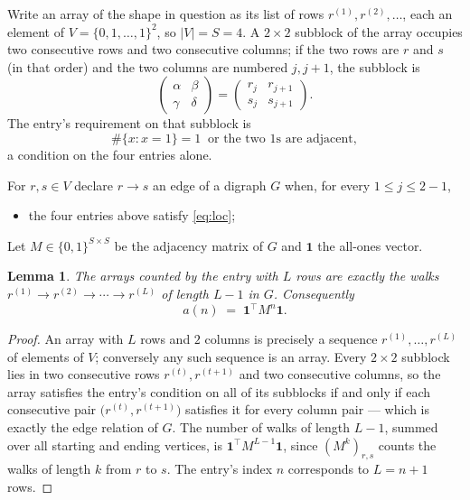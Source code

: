 \documentclass[11pt,a4paper]{article}
\theoremstyle{plain}
\newtheorem{lemma}[theorem]{Lemma}
\theoremstyle{definition}
\begin{document}
Write an array of the shape in question as its list of rows
$r^{(1)},r^{(2)},\dots$, each an element of
$V=\{0,1,\dots,1\}^{2}$, so $|V|=S=4$. A $2\times2$ subblock of the array
occupies two consecutive rows and two consecutive columns; if the two rows are $r$
and $s$ (in that order) and the two columns are numbered $j,j+1$,
the subblock is
\[
\begin{pmatrix}\alpha&\beta\\\gamma&\delta\end{pmatrix}=\begin{pmatrix}r_j&r_{j+1}\\s_j&s_{j+1}\end{pmatrix}.
\]
The entry's requirement on that subblock is
\begin{equation}\label{eq:loc}
\#\{x:x=1\}=1\ \text{ or the two }1\text{s are adjacent},
\end{equation}
a condition on the four entries alone.

For $r,s\in V$ declare $r\to s$ an edge of a digraph $G$ when, for every
$1\le j\le 2-1$,
\begin{itemize}
\item the four entries above satisfy \eqref{eq:loc};

\end{itemize}
Let $M\in\{0,1\}^{S\times S}$ be the adjacency matrix of $G$ and $\mathbf{1}$ the
all-ones vector.

\begin{lemma}\label{lem:walk}
The arrays counted by the entry with $L$ rows are exactly the walks
$r^{(1)}\to r^{(2)}\to\cdots\to r^{(L)}$ of length $L-1$ in $G$. Consequently
\[
a(n)\;=\;\mathbf{1}^{\!\top}M^{n}\mathbf{1} .
\]
\end{lemma}

\begin{proof}
An array with $L$ rows and $2$ columns is precisely a sequence
$r^{(1)},\dots,r^{(L)}$ of elements of $V$; conversely any such sequence is an array.
Every $2\times2$ subblock lies in two consecutive rows $r^{(t)},r^{(t+1)}$ and two
consecutive columns, so the array satisfies the entry's condition on all of its subblocks
if and only if each consecutive pair $\bigl(r^{(t)},r^{(t+1)}\bigr)$ satisfies it for
every column pair --- which is exactly the edge relation of $G$. The number of walks of
length $L-1$, summed over all starting and ending vertices, is
$\mathbf{1}^{\!\top}M^{L-1}\mathbf{1}$, since $(M^{k})_{r,s}$ counts the walks of
length $k$ from $r$ to $s$. The entry's index $n$ corresponds to $L=n+1$ rows.
\end{proof}
\end{document}
